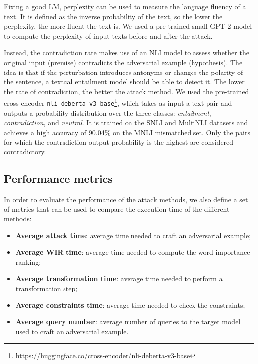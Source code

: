 Fixing a good LM, perplexity can be used to measure the language fluency of a text. 
It is defined as the inverse probability of the text, so the lower the perplexity, the more fluent the text is.
We used a pre-trained small GPT-2 \cite{gpt2} model to compute the perplexity of input texts before and after the attack.

Instead, the contradiction rate makes use of an NLI model to assess whether the original input (premise) contradicts the adversarial example (hypothesis).
The idea is that if the perturbation introduces antonyms or changes the polarity of the sentence, a textual entailment model should be able to detect it. The lower the rate of contradiction, the better the attack method.
We used the pre-trained cross-encoder \texttt{nli-deberta-v3-base}\footnote{\url{https://huggingface.co/cross-encoder/nli-deberta-v3-base}}, which takes as input a text pair and outputs a probability distribution over the three classes: \emph{entailment}, \emph{contradiction}, and \emph{neutral}.
It is trained on the SNLI \cite{journals/corr/BowmanAPM15} and MultiNLI \cite{journals/corr/WilliamsNB17} datasets and achieves a high accuracy of 90.04\% on the MNLI mismatched set.
Only the pairs for which the contradiction output probability is the highest are considered contradictory.


\subsection{Performance metrics}\label{subsec:performance-metrics}

In order to evaluate the performance of the attack methods, we also define a set of metrics that can be used to compare the execution time of the different methods:
\begin{itemize}
    \item \textbf{Average attack time}: average time needed to craft an adversarial example;
    \item \textbf{Average WIR time}: average time needed to compute the word importance ranking;
    \item \textbf{Average transformation time}: average time needed to perform a transformation step;
    \item \textbf{Average constraints time}: average time needed to check the constraints;
    \item \textbf{Average query number}: average number of queries to the target model used to craft an adversarial example.
\end{itemize}

